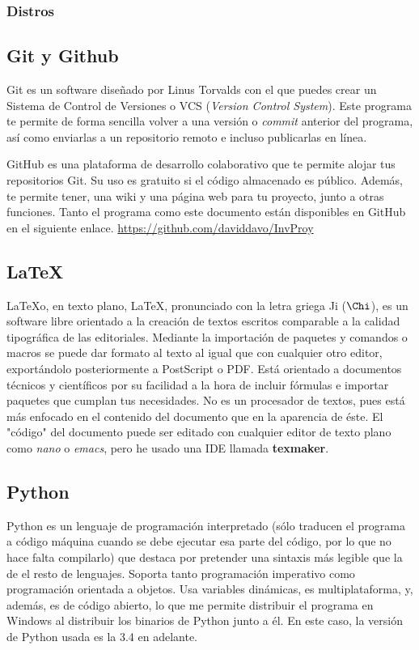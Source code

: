 \documentclass[a4paper, 11pt, twoside]{article} %
\begin{document}
\subsubsection{Distros}

\subsection{Git y Github}
Git es un software diseñado por Linus Torvalds con el que puedes crear un Sistema de Control de Versiones o VCS (\textit{Version Control System}). Este programa te permite de forma sencilla volver a una versión o \textit{commit} anterior del programa, así como enviarlas a un repositorio remoto e incluso publicarlas en línea.

GitHub es una plataforma de desarrollo colaborativo que te permite alojar tus repositorios Git. Su uso es gratuito si el código almacenado es público. Además, te permite tener, una wiki y una página web para tu proyecto, junto a otras funciones.
Tanto el programa como este documento están disponibles en GitHub en el siguiente enlace. \url{https://github.com/daviddavo/InvProy}

\subsection{LaTeX}
\LaTeX\space o, en texto plano, LaTeX, pronunciado con la letra griega 
Ji ($\Chi$), es un software libre orientado a la creación de textos escritos comparable a la calidad tipográfica de las editoriales. Mediante la importación de paquetes y comandos o macros se puede dar formato al texto al igual que con cualquier otro editor, exportándolo posteriormente a PostScript o PDF. Está orientado a documentos técnicos y científicos por su facilidad a la hora de incluir fórmulas e importar paquetes que cumplan tus necesidades. No es un procesador de textos, pues está más enfocado en el contenido del documento que en la aparencia de éste.
El "código" del documento puede ser editado con cualquier editor de texto plano como \textit{nano} o \textit{emacs}, pero he usado una IDE llamada \textbf{texmaker}.

\subsection{Python}
Python es un lenguaje de programación interpretado (sólo traducen el programa a código máquina cuando se debe ejecutar esa parte del código, por lo que no hace falta compilarlo) que destaca por pretender una sintaxis más legible que la de el resto de lenguajes. Soporta tanto programación imperativo como programación orientada a objetos. Usa variables dinámicas, es multiplataforma, y, además, es de código abierto, lo que me permite distribuir el programa en Windows al distribuir los binarios de Python junto a él. En este caso, la versión de Python usada es la 3.4 en adelante.
\end{document}
